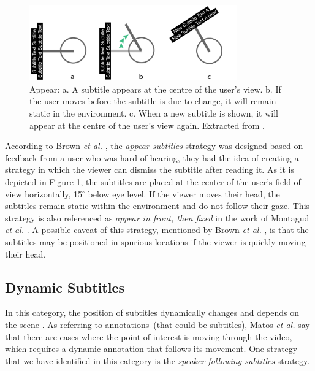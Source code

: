 \begin{figure}[!ht]
    \centering
    \includegraphics[width=0.8\textwidth]{img/video360/appear.png}
    \caption{Appear: a. A subtitle appears at the centre of the user's view. b. If the user moves before the subtitle is due to change, it will remain static in the environment. c. When a new subtitle is shown, it will appear at the centre of the user's view again. Extracted from \cite{brown_subtitles_2017}.}
    \label{fig:appear_subtitle}
\end{figure}

According to Brown \emph{et al.} \cite{brown_subtitles_2017}, the \emph{appear subtitles} strategy was designed based on feedback from a user who was hard of hearing, they had the idea of creating a strategy in which the viewer can dismiss the subtitle after reading it. As it is depicted in Figure \ref{fig:appear_subtitle}, the subtitles are placed at the center of the user's field of view horizontally, 15$^{\circ}$ below eye level. If the viewer moves their head, the subtitles remain static within the environment and do not follow their gaze. This strategy is also referenced as \emph{appear in front, then fixed} in the work of Montagud \emph{et al.} \cite{montagud_culture_2020}. A possible caveat of this strategy, mentioned by Brown \emph{et al.} \cite{brown_subtitles_2017}, is that the subtitles may be positioned in spurious locations if the viewer is quickly moving their head.

\subsection{Dynamic Subtitles}
\label{subsection:dynamic_subtitles}

In this category, the position of subtitles dynamically changes and depends on the scene \cite{rothe_dynamic_2018}. As referring to annotations~(that could be subtitles), Matos \emph{et al.} \cite{matos_dynamic_2018} say that there are cases where the point of interest is moving through the video, which requires a dynamic annotation that follows its movement. One strategy that we have identified in this category is the \emph{speaker-following subtitles} strategy.

